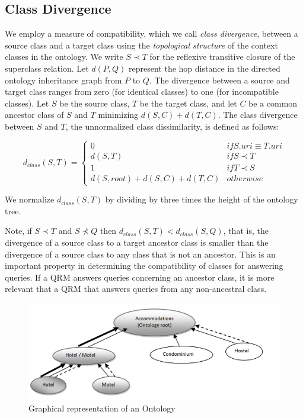\documentclass{IOS-Book-Article}
\begin{document}
\subsection{Class Divergence}
\label{sec:ctd}
We employ a measure of compatibility, which we call \textit{class divergence}, between a source class and a target class using the \textit{topological structure} of the context classes in the ontology. We write $S \prec T$ for the reflexive transitive closure of the superclass relation. Let $d(P,Q)$ represent the hop distance in the directed ontology inheritance graph from $P$ to $Q$. The divergence between a source and target class ranges from zero (for identical classes) to one (for incompatible classes).  Let $S$ be the source class, $T$ be the target class, and let $C$ be a common ancestor class of $S$ and $T$ minimizing $d(S,C) + d(T,C)$. The class divergence between $S$ and $T$, the unnormalized class dissimilarity, is defined as follows:

\begin{equation}
d_{class}(S, T) =  \begin{cases}

0&if S.{uri} \equiv T.{uri}\\
d(S, T)&if S \prec T\\
1&if T \prec S\\
d(S,root) + d(S,C) + d(T,C)&otherwise
\end{cases}
\end{equation}

We normalize $d_{class}(S, T)$ by dividing by three times the height of the ontology tree.

Note, if $S \prec T$ and $S \not\prec Q$ then $d_{class}(S,T) < d_{class}(S,Q)$,
that is, the divergence of a source class to a target ancestor class is smaller than the divergence of a source class to any class that is not an ancestor. This is an important property in determining the compatibility of classes for answering queries.  If a QRM answers queries concerning an ancestor class, it is more relevant that a QRM that answers queries from any non-ancestral class. 

\begin{figure}[t]
\centering
\includegraphics[width=120mm]{algorithm1.png}
\caption{Graphical representation of an Ontology}
\label{fig:graphonto}
\end{figure}
\end{document}
